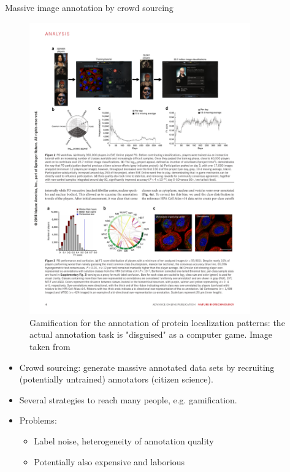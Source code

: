 \documentclass[xcolor=pdftex,dvipsnames,table]{beamer}
\begin{document}
\begin{frame}{Massive image annotation by crowd sourcing}
\begin{figure}[htb]
   \centering
   \includegraphics[width=0.85\textwidth]{../graphics/gamification.pdf}
   \caption{Gamification for the annotation of protein localization patterns: the actual annotation task is "disguised" as a computer game. Image taken from \cite{Sullivan2018a}}
\end{figure}
\begin{itemize}
   \item Crowd sourcing: generate massive annotated data sets by recruiting (potentially untrained) annotators (citizen science).
   \item Several strategies to reach many people, e.g. gamification. 
   \item Problems: 
   \begin{itemize}
      \item Label noise, heterogeneity of annotation quality
      \item Potentially also expensive and laborious
   \end{itemize}
\end{itemize}
\end{frame}
\end{document}
